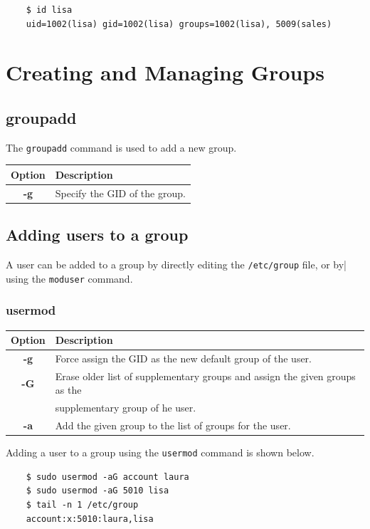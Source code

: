 \documentclass{report}
\begin{document}
	\begin{verbatim}
	$ id lisa
	uid=1002(lisa) gid=1002(lisa) groups=1002(lisa), 5009(sales)
	\end{verbatim}
	
	\section{Creating and Managing Groups}
	\subsection{groupadd}
	The \verb|groupadd| command is used to add a new group. 
	
	\begin{tabular}{cl}
		\toprule
		\textbf{Option} &\textbf{Description} \\
		\midrule
		\textbf{-g} &Specify the GID of the group. \\
		\bottomrule
	\end{tabular}

	\subsection{Adding users to a group}
	A user can be added to a group by directly editing the \verb|/etc/group| file, or by| using the \verb|moduser| command.
	
	\subsubsection{usermod}
	\begin{tabular}{cl}
		\toprule
		\textbf{Option} &\textbf{Description} \\
		\midrule
		\textbf{-g} &Force assign the GID as the new default group of the user.  \\
		\textbf{-G} &Erase older list of supplementary groups and assign the given groups as the \\&supplementary group of he user. \\
		\textbf{-a} &Add the given group to the list of groups for the user. \\
		\bottomrule
	\end{tabular}

	Adding a user to a group using the \verb|usermod| command is shown below. 

	\begin{verbatim}
	$ sudo usermod -aG account laura
	$ sudo usermod -aG 5010 lisa
	$ tail -n 1 /etc/group
	account:x:5010:laura,lisa
	\end{verbatim}
\end{document}
